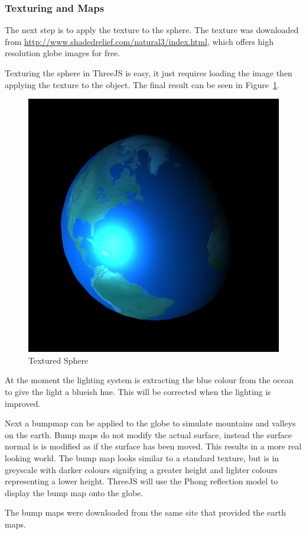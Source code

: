 \documentclass[]{article}
\begin{document}
\subsubsection{Texturing and Maps}

The next step is to apply the texture to the sphere.
The texture was downloaded from \url{http://www.shadedrelief.com/natural3/index.html},
which offers high resolution globe images for free.

Texturing the sphere in ThreeJS is easy, it just requires loading the image then applying the texture to the object.
The final result can be seen in Figure~\ref{fig:textured_sphere}.

\begin{figure}[H]
   \centering
   \includegraphics[width=0.5\linewidth]{images/textured_sphere}
   \caption{Textured Sphere}
   \label{fig:textured_sphere}
\end{figure}

At the moment the lighting system is extracting the blue colour from the ocean to give the light a blueish hue.
This will be corrected when the lighting is improved.

Next a bumpmap can be applied to the globe to simulate mountains and valleys on the earth.
Bump maps do not modify the actual surface, instead the surface normal is is modified as if the surface has been moved.
This results in a more real looking world.
The bump map looks similar to a standard texture, but is in greyscale with darker colours signifying a greater height and lighter colours representing a lower height.
ThreeJS will use the Phong reflection model\cite{meshstandardmaterial_2017} to display the bump map onto the globe.


The bump maps were downloaded from the same site that provided the earth maps.
\end{document}
